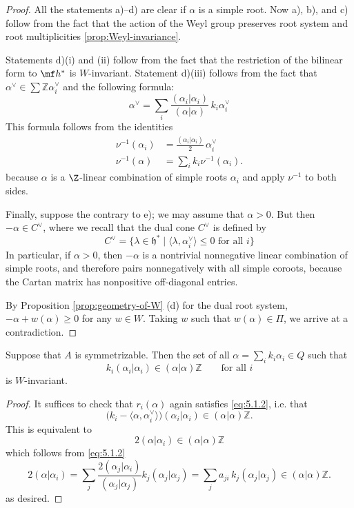 \documentclass[12pt]{article}
\begin{document}
\begin{proof}
    All the statements a)--d) are clear if $\alpha$ is a simple root. Now a), b), and c) follow from the fact that the action of the Weyl group preserves root system and root multiplicities \ref{prop:Weyl-invariance}.

    Statements d)(i) and (ii) follow from the fact that the restriction of the bilinear form to $\mf h^*$ is $W$-invariant. Statement d)(iii) follows from the fact that $\alpha^\vee \in \sum \mathbb{Z}\alpha_i^\vee$ and the following formula:
    \[
        \alpha^\vee = \sum_i \frac{(\alpha_i|\alpha_i)}{(\alpha|\alpha)}\, k_i \alpha_i^\vee
    \] This formula follows from the identities \begin{align*}
        \nu^{-1}(\alpha_i) & = \frac{(\alpha_i|\alpha_i)}{2} \, \alpha_i^\vee \\
        \nu^{-1}(\alpha)   & = \sum_i k_i \nu^{-1}(\alpha_i).
    \end{align*} because $\alpha$ is a $\Z$-linear combination of simple roots $\alpha_i$ and apply $\nu^{-1}$ to both sides.

    Finally, suppose the contrary to e); we may assume that $\alpha > 0$. But then $-\alpha \in C^\vee$, where we recall that the dual cone $C^\vee$ is defined by
    \[
        C^\vee = \{ \lambda \in \mathfrak{h}^* \mid \langle \lambda, \alpha_i^\vee \rangle \leq 0 \text{ for all } i \}
    \] In particular, if $\alpha > 0$, then $-\alpha$ is a nontrivial nonnegative linear combination of simple roots, and therefore pairs nonnegatively with all simple coroots, because the Cartan matrix has nonpositive off-diagonal entries.

    By Proposition \ref{prop:geometry-of-W} (d) for the dual root system, $-\alpha + w(\alpha) \geq 0$ for any $w \in W$. Taking $w$ such that $w(\alpha) \in \Pi$, we arrive at a contradiction.
\end{proof}

\begin{lemma}\label{lem:5.1.1}
    Suppose that $A$ is symmetrizable. Then the set of all
    $\alpha = \sum_i k_i \alpha_i \in Q$ such that
    \begin{equation}\label{eq:5.1.2}
        k_i (\alpha_i|\alpha_i) \in (\alpha|\alpha)\mathbb{Z}
        \qquad \text{for all $i$}
    \end{equation}
    is $W$-invariant.
\end{lemma}

\begin{proof}
    It suffices to check that $r_i(\alpha)$ again satisfies \ref{eq:5.1.2}, i.e. that
    \[
        \big(k_i - \langle \alpha,\alpha_i^\vee\rangle\big)(\alpha_i|\alpha_i)
        \in (\alpha|\alpha)\mathbb{Z}.
    \]
    This is equivalent to
    \begin{equation}\label{eq:5.1.3}
        2(\alpha|\alpha_i) \in (\alpha|\alpha)\mathbb{Z}
    \end{equation}
    which follows from \ref{eq:5.1.2}
    \[
        2(\alpha|\alpha_i)
        = \sum_j \frac{2(\alpha_j|\alpha_i)}{(\alpha_j|\alpha_j)}
        k_j(\alpha_j|\alpha_j)
        = \sum_j a_{ji}\,k_j(\alpha_j|\alpha_j)
        \in (\alpha|\alpha)\mathbb{Z}.
    \]
    as desired.
\end{proof}
\end{document}
